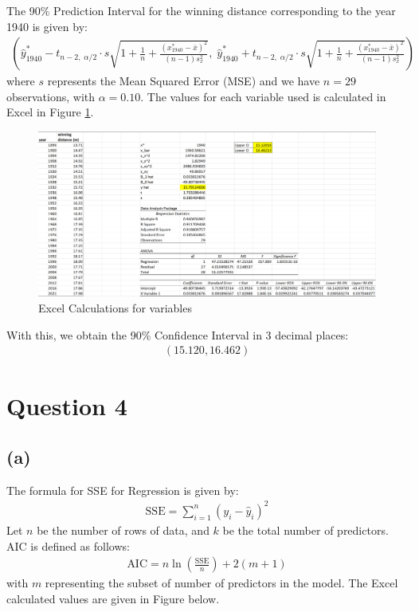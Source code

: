 \documentclass[12pt]{article}
\begin{document}
The 90\% Prediction Interval for the winning distance corresponding to the year 1940 is given by: \begin{align*}
    \left( \hat{y}^{*}_{1940} - t_{n-2, \; \alpha / 2} \cdot s \sqrt{1 + \frac{1}{n} + \frac{(x^{*}_{1940} - \bar{x})^{2}}{(n-1)s_x^{2}}}, \; \hat{y}^{*}_{1940} + t_{n-2, \; \alpha / 2} \cdot s \sqrt{1 + \frac{1}{n} + \frac{(x^{*}_{1940} - \bar{x})^{2}}{(n-1)s_x^{2}}}\right)
\end{align*} where $s$ represents the Mean Squared Error (MSE) and we have $n = 29$ observations, with $\alpha = 0.10$. The values for each variable used is calculated in Excel in Figure \ref{fig:3-excel}. 

\begin{figure}[H]
    \centering
    \includegraphics[width=\textwidth]{Images/Q3Regression.png}
    \caption{Excel Calculations for variables}
    \label{fig:3-excel}
\end{figure}

\noindent With this, we obtain the 90\% Confidence Interval in 3 decimal places: \begin{align*}
    \left( 15.120, 16.462 \right)
\end{align*}

\newpage

\section*{Question 4}

\subsection*{(a)}

The formula for SSE for Regression is given by: \begin{align*}
    \text{SSE} = \sum_{i=1}^{n} (y_i - \hat{y}_i)^{2} 
\end{align*} Let $n$ be the number of rows of data, and $k$ be the total number of predictors. AIC is defined as follows: \begin{align*}
    \text{AIC} = n \ln \left( \frac{\text{SSE}}{n} \right) + 2 (m+1)
\end{align*} with $m$ representing the subset of number of predictors in the model. The Excel calculated values are given in Figure below. 
\end{document}
